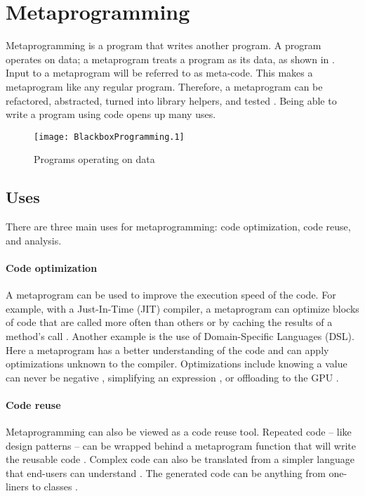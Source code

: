 \section{Metaprogramming}
\label{sec:metaprogramming}
Metaprogramming is a program that writes another program.
A program operates on data; a metaprogram treats a program as its data, as shown in  \cite{savidis_19_01, anggoro_17_01, sheard_01_01}.
Input to a metaprogram will be referred to as meta-code.
This makes a metaprogram like any regular program.
Therefore, a metaprogram can be refactored, abstracted, turned into library helpers, and tested \cite{lilis_15_01}.
Being able to write a program using code opens up many uses.

\begin{figure}[h]
	\centering
	\texttt{[image: BlackboxProgramming.1]}
	\caption{Programs operating on data}
	\label{fig:BlackboxProgramming}
\end{figure}


\subsection{Uses}
There are three main uses for metaprogramming: code optimization, code reuse, and analysis.

\paragraph{Code optimization}
A metaprogram can be used to improve the execution speed of the code.
For example, with a Just-In-Time (JIT) compiler, a metaprogram can optimize blocks of code that are called more often than others \cite{hinsen_13_01} or by caching the results of a method's call \cite{seaton_15_01}.
Another example is the use of Domain-Specific Languages (DSL). 
Here a metaprogram has a better understanding of the code and can apply optimizations unknown to the compiler.
Optimizations include knowing a value can never be negative \cite{hinsen_13_01}, simplifying an expression \cite{sheard_01_01}, or offloading to the GPU \cite{videau_18_01}.

\paragraph{Code reuse}
Metaprogramming can also be viewed as a code reuse tool.
Repeated code -- like design patterns \cite{lilis_15_01, alexandrescu_01_01} -- can be wrapped behind a metaprogram function that will write the reusable code \cite{savidis_19_01, klabnik_2019_01}.
Complex code can also be translated from a simpler language that end-users can understand \cite{hinsen_13_01}.
The generated code can be anything from one-liners to classes \cite{savidis_19_01}.

